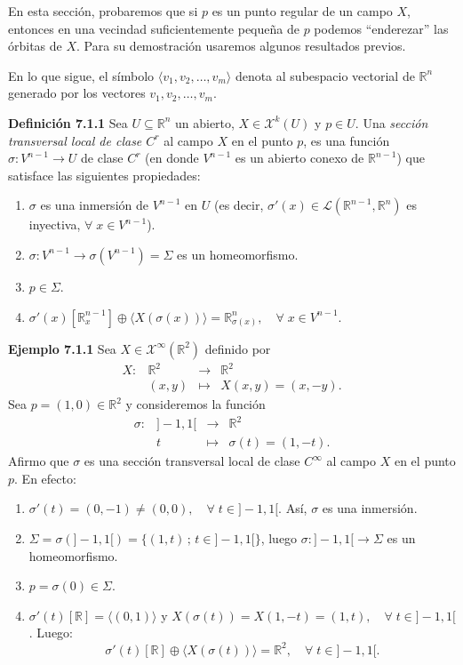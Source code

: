 \documentclass[11pt,a4paper]{article}
\theoremstyle{definition}
\theoremstyle{plain}
\theoremstyle{remark}
\begin{document}
	En esta sección, probaremos que si $p$ es un punto regular de un campo $X$, entonces en una vecindad suficientemente pequeña de $p$ podemos ``enderezar'' las órbitas de $X$. Para su demostración usaremos algunos resultados previos.
	
	En lo que sigue, el símbolo $\langle v_1, v_2, \dots, v_m \rangle$ denota al subespacio vectorial de $\mathbb{R}^n$ generado por los vectores $v_1, v_2, \dots, v_m$.
	
	\noindent \textbf{Definición 7.1.1} Sea $U \subseteq \mathbb{R}^n$ un abierto, $X \in \mathcal{X}^k(U)$ y $p \in U$. Una \textit{sección transversal local de clase $C^r$} al campo $X$ en el punto $p$, es una función $\sigma : V^{n-1} \to U$ de clase $C^r$ (en donde $V^{n-1}$ es un abierto conexo de $\mathbb{R}^{n-1}$) que satisface las siguientes propiedades:
	\begin{enumerate}[label=\roman*)]
		\item $\sigma$ es una inmersión de $V^{n-1}$ en $U$ (es decir, $\sigma'(x) \in \mathcal{L}(\mathbb{R}^{n-1}, \mathbb{R}^n)$ es inyectiva, $\forall \; x \in V^{n-1}$).
		\item $\sigma : V^{n-1} \to \sigma(V^{n-1}) = \Sigma$ es un homeomorfismo.
		\item $p \in \Sigma$.
		\item $\sigma'(x)[\mathbb{R}^{n-1}_x] \oplus \langle X(\sigma(x)) \rangle = \mathbb{R}^n_{\sigma(x)}, \quad \forall \; x \in V^{n-1}$.
	\end{enumerate}
	
	\noindent \textbf{Ejemplo 7.1.1} Sea $X \in \mathcal{X}^\infty(\mathbb{R}^2)$ definido por
	\[
	\begin{array}{rccc}
		X : & \mathbb{R}^2 & \to & \mathbb{R}^2 \\
		& (x, y) & \mapsto & X(x, y) = (x, -y).
	\end{array}
	\]
	Sea $p = (1, 0) \in \mathbb{R}^2$ y consideremos la función
	\[
	\begin{array}{rccc}
		\sigma : & {]-1, 1[} & \to & \mathbb{R}^2 \\
		& t & \mapsto & \sigma(t) = (1, -t).
	\end{array}
	\]
	Afirmo que $\sigma$ es una sección transversal local de clase $C^\infty$ al campo $X$ en el punto $p$. En efecto:
	\begin{enumerate}[label=\roman*)]
		\item $\sigma'(t) = (0, -1) \neq (0, 0), \quad \forall \; t \in {]-1, 1[}$. Así, $\sigma$ es una inmersión.
		\item $\Sigma = \sigma({]-1, 1[}) = \{(1, t) \,;\, t \in {]-1, 1[}\}$, luego $\sigma : {]-1, 1[} \to \Sigma$ es un homeomorfismo.
		\item $p = \sigma(0) \in \Sigma$.
		\item $\sigma'(t)[\mathbb{R}] = \langle (0, 1) \rangle$ y $X(\sigma(t)) = X(1, -t) = (1, t), \quad \forall \; t \in {]-1, 1[}$. Luego:
		\[
		\sigma'(t)[\mathbb{R}] \oplus \langle X(\sigma(t)) \rangle = \mathbb{R}^2, \quad \forall \; t \in {]-1, 1[}.
		\]
	\end{enumerate}
	
\end{document}
